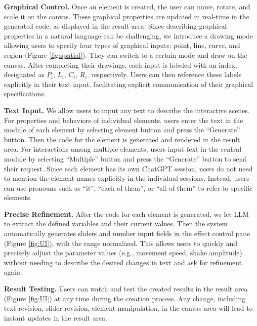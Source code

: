 \textbf{Graphical Control.}
Once {an} %
element is created, the user %
can move, rotate, and scale it on the canvas. These graphical properties are updated in real-time in the generated code, as displayed in the result area. Since describing graphical properties in a natural language can be challenging, we {introduce} a drawing mode allowing %
users to specify four types of graphical inputs: point, line, curve, and region (Figure \ref{fig:spatial}). They can switch to a certain mode and draw on the canvas. After completing their drawings, each input is labeled with an index, designated as \( \mathit{P}_i \), \( \mathit{L}_i \), \( \mathit{C}_i \), \( \mathit{R}_i \), respectively. Users can then reference these labels explicitly in their text input, facilitating {explicit} %
communication of their graphical specifications.



\textbf{Text Input.}
{We} allow users to input any text to describe the interactive scenes. For properties and behaviors of individual elements, users enter the text in the module of each element by selecting element button and press the ``Generate'' button. Then the code for the element is generated and rendered in the result area. For interactions among multiple elements, users input text in the central module by selecting ``Multiple'' button and press the ``Generate'' button to send their request. Since each element has its own ChatGPT session, users do not need to mention the element names explicitly in the individual sessions. Instead, users can use pronouns such as ``it'', ``each of them'', or ``all of them'' to refer to specific elements.

\textbf{Precise Refinement.} After the code for each element is generated, we let LLM to extract the defined variables and their current values. Then the system automatically generates sliders and number input fields in the effect control pane (Figure \ref{fig:UI}), with the range normalized. This allows users to quickly and precisely adjust the parameter values (e.g., movement speed, shake amplitude) without needing to describe the desired changes in text and ask for refinement again. 

{
\textbf{Result Testing.} Users can watch and test the created results in the result area (Figure \ref{fig:UI}) at any time during the creation process. Any change, including text revision, slider revision, element manipulation, %
in the canvas area will lead to instant updates in the result area.

}


